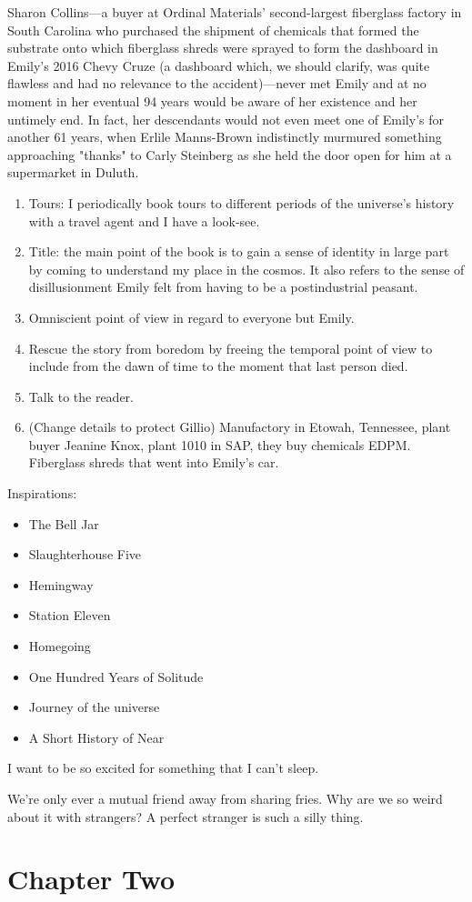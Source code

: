 \documentclass[smalldemyvopaper,11pt,twoside,onecolumn,openright,extrafontsizes]{memoir}
\begin{document}
Sharon Collins---a buyer at Ordinal Materials' second-largest fiberglass factory in South Carolina who purchased the shipment of chemicals that formed the substrate onto which fiberglass shreds were sprayed to form the dashboard in Emily's 2016 Chevy Cruze (a dashboard which, we should clarify, was quite flawless and had no relevance to the accident)---never met Emily and at no moment in her eventual 94 years would be aware of her existence and her untimely end. In fact, her descendants would not even meet one of Emily's for another 61 years, when Erlile Manns-Brown indistinctly murmured something approaching "thanks" to Carly Steinberg as she held the door open for him at a supermarket in Duluth.

\begin{enumerate}
    \item Tours: I periodically book tours to different periods of the universe's history with a travel agent and I have a look-see. 
    \item Title: the main point of the book is to gain a sense of identity in large part by coming to understand my place in the cosmos. It also refers to the sense of disillusionment Emily felt from having to be a postindustrial peasant.
    \item Omniscient point of view in regard to everyone but Emily.
    \item Rescue the story from boredom by freeing the temporal point of view to include from the dawn of time to the moment that last person died. 
    \item Talk to the reader. 
    \item (Change details to protect Gillio) Manufactory in Etowah, Tennessee, plant buyer Jeanine Knox, plant 1010 in SAP, they buy chemicals EDPM. Fiberglass shreds that went into Emily's car. 
\end{enumerate}

Inspirations:
\begin{itemize}
    \item The Bell Jar
    \item Slaughterhouse Five
    \item Hemingway
    \item Station Eleven
    \item Homegoing
    \item One Hundred Years of Solitude
\end{itemize}

\begin{itemize}
\item Journey of the universe
\item A Short History of Near
\end{itemize}

I want to be so excited for something that I can't sleep.

We're only ever a mutual friend away from sharing fries. Why are we so weird about it with strangers? 
A perfect stranger is such a silly thing.



\chapter{Chapter Two}
\lipsum[21-40]



\end{document}
